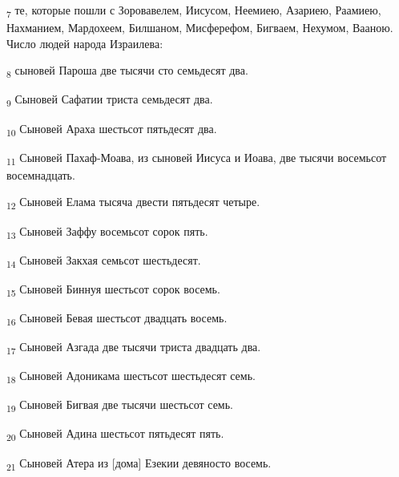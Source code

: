 \begin{tcolorbox}
\textsubscript{7} те, которые пошли с Зоровавелем, Иисусом, Неемиею, Азариею, Раамиею, Нахманием, Мардохеем, Билшаном, Мисферефом, Бигваем, Нехумом, Вааною. Число людей народа Израилева:
\end{tcolorbox}
\begin{tcolorbox}
\textsubscript{8} сыновей Пароша две тысячи сто семьдесят два.
\end{tcolorbox}
\begin{tcolorbox}
\textsubscript{9} Сыновей Сафатии триста семьдесят два.
\end{tcolorbox}
\begin{tcolorbox}
\textsubscript{10} Сыновей Араха шестьсот пятьдесят два.
\end{tcolorbox}
\begin{tcolorbox}
\textsubscript{11} Сыновей Пахаф-Моава, из сыновей Иисуса и Иоава, две тысячи восемьсот восемнадцать.
\end{tcolorbox}
\begin{tcolorbox}
\textsubscript{12} Сыновей Елама тысяча двести пятьдесят четыре.
\end{tcolorbox}
\begin{tcolorbox}
\textsubscript{13} Сыновей Заффу восемьсот сорок пять.
\end{tcolorbox}
\begin{tcolorbox}
\textsubscript{14} Сыновей Закхая семьсот шестьдесят.
\end{tcolorbox}
\begin{tcolorbox}
\textsubscript{15} Сыновей Биннуя шестьсот сорок восемь.
\end{tcolorbox}
\begin{tcolorbox}
\textsubscript{16} Сыновей Бевая шестьсот двадцать восемь.
\end{tcolorbox}
\begin{tcolorbox}
\textsubscript{17} Сыновей Азгада две тысячи триста двадцать два.
\end{tcolorbox}
\begin{tcolorbox}
\textsubscript{18} Сыновей Адоникама шестьсот шестьдесят семь.
\end{tcolorbox}
\begin{tcolorbox}
\textsubscript{19} Сыновей Бигвая две тысячи шестьсот семь.
\end{tcolorbox}
\begin{tcolorbox}
\textsubscript{20} Сыновей Адина шестьсот пятьдесят пять.
\end{tcolorbox}
\begin{tcolorbox}
\textsubscript{21} Сыновей Атера из [дома] Езекии девяносто восемь.
\end{tcolorbox}
